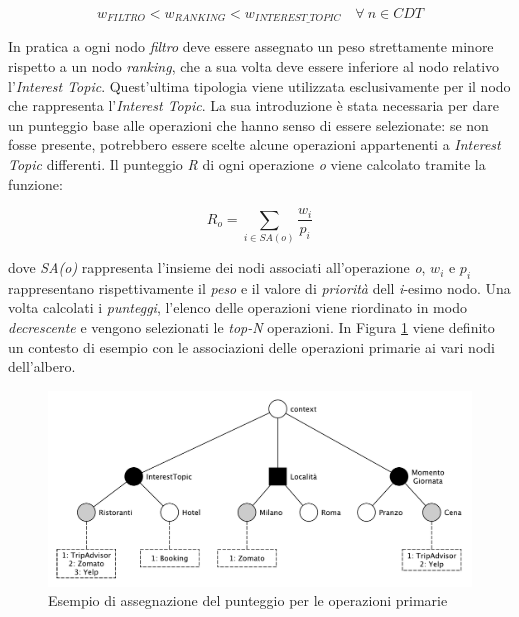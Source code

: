 \begin{equation*}
w_{FILTRO} < w_{RANKING} < w_{INTEREST\_TOPIC} \quad \forall\ n \in CDT
\end{equation*}

In pratica a ogni nodo \emph{filtro} deve essere assegnato un peso strettamente minore rispetto a un nodo \emph{ranking}, che a sua volta deve essere inferiore al nodo relativo l'\emph{Interest Topic}. Quest'ultima tipologia viene utilizzata esclusivamente per il nodo che rappresenta l'\emph{Interest Topic}. La sua introduzione è stata necessaria per dare un punteggio base alle operazioni che hanno senso di essere selezionate: se non fosse presente, potrebbero essere scelte alcune operazioni appartenenti a \emph{Interest Topic} differenti. Il punteggio \emph{R} di ogni operazione \emph{o} viene calcolato tramite la funzione:

\begin{equation}\label{eq:primary-service-formula}
R_o = \sum_{i \in SA(o)}{\frac{w_i}{p_i}}
\end{equation}

dove \emph{SA(o)} rappresenta l'insieme dei nodi associati all'operazione \emph{o}, $ w_i $ e $ p_i $ rappresentano rispettivamente il \emph{peso} e il valore di \emph{priorità} dell \emph{i}-esimo nodo. Una volta calcolati i \emph{punteggi}, l'elenco delle operazioni viene riordinato in modo \emph{decrescente} e vengono selezionati le \emph{top-N} operazioni. In Figura \ref{fig:esempio-punteggio-primari} viene definito un contesto di esempio con le associazioni delle operazioni primarie ai vari nodi dell'albero.

\begin{figure}[ht]
	\centering
	\includegraphics[width=\textwidth]{3-metodologia-camus/Immagini/esempio-punteggio-primari.pdf}
	\caption{Esempio di assegnazione del punteggio per le operazioni primarie}\label{fig:esempio-punteggio-primari}
\end{figure}

